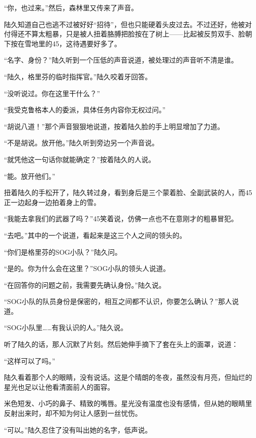 “你，也过来。”然后，森林里又传来了声音。

陆久知道自己也逃不过被好好“招待”，但也只能硬着头皮过去。不过还好，他被对付得还不算太粗暴，只是被人扭着胳膊把脸按在了树上——比起被反剪双手、脸朝下按在雪地里的45，这待遇要好多了。

“名字、身份？”陆久听到一个压低的声音说道，被处理过的声音听不清是谁。

“陆久，格里芬的临时指挥官。”陆久咬着牙回答。

“没听说过。你在这里干什么？”

“我受克鲁格本人的委派，具体任务内容你无权过问。”

“胡说八道！”那个声音狠狠地说道，按着陆久脸的手上明显增加了力道。

“不是胡说。放开他。”陆久听到旁边另一个声音说。

“就凭他这一句话你就能确定？”按着陆久的人说。

“能。放开他们。”

扭着陆久的手松开了，陆久转过身，看到身后是三个蒙着脸、全副武装的人，而45正一边起身一边拍着身上的雪。

“我能去拿我们的武器了吗？”45笑着说，仿佛一点也不在意刚才的粗暴冒犯。

“去吧。”其中的一个说道，看起来是这三个人之间的领头的。

“你们是格里芬的SOG小队？”陆久问。

“是的。你为什么会在这里？”SOG小队的领头人说道。

“在回答你的问题之前，我需要先确认身份。”陆久说。

“SOG小队的队员身份是保密的，相互之间都不认识，你要怎么确认？”那人说道。

“SOG小队里……有我认识的人。”陆久说。

听了陆久的话，那人沉默了片刻。然后她伸手摘下了套在头上的面罩，说道：

“这样可以了吗。”

陆久看着那个人的眼睛，没有说话。这是个晴朗的冬夜，虽然没有月亮，但灿烂的星光也足以让他看清面前人的面容。

米色短发、小巧的鼻子、精致的嘴唇。星光没有温度也没有感情，但从她的眼睛里反射出来时，却不知为何让人感到一丝忧伤。

“可以。”陆久忍住了没有叫出她的名字，低声说。